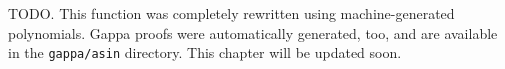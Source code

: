 TODO. This function was completely rewritten using machine-generated
polynomials. Gappa proofs were automatically generated, too, and are
available in the \texttt{gappa/asin} directory. This chapter will be
updated soon.

